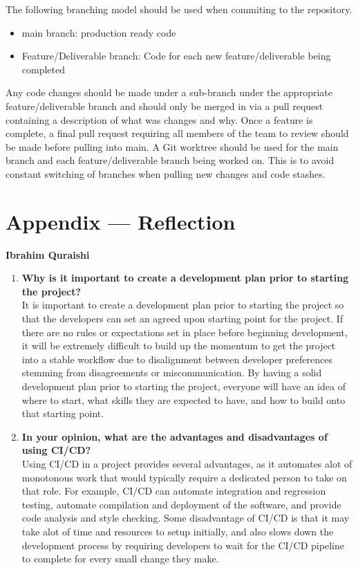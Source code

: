 \documentclass{article}
\begin{document}
The following branching model should be used when commiting to the repository.
\begin{itemize}
  \item main branch: production ready code
  \item Feature/Deliverable branch: Code for each new feature/deliverable being completed
\end{itemize}

Any code changes should be made under a sub-branch under the appropriate feature/deliverable branch and should only be merged in via a pull request containing a description of what was changes and why. Once a feature is complete, a final pull request requiring all members of the team to review should be made before pulling into main.
\newline\newline
A Git worktree should be used for the main branch and each feature/deliverable branch being worked on. This is to avoid constant switching of branches when pulling new changes and code stashes.

\newpage{}

\section*{Appendix --- Reflection}

\textbf{Ibrahim Quraishi}
\begin{enumerate}
    \item \textbf{Why is it important to create a development plan prior to starting the
    project?}\\

    It is important to create a development plan prior to starting the project so that the developers can set an agreed upon starting point for the project. If there are no rules or expectations set in place before beginning development, it will be extremely difficult to build up the momentum to get the project into a stable workflow due to disalignment between developer preferences stemming from disagreements or miscommunication. By having a solid development plan prior to starting the project, everyone will have an idea of where to start, what skills they are expected to have, and how to build onto that starting point.

    \item \textbf{In your opinion, what are the advantages and disadvantages of using
    CI/CD?}\\

    Using CI/CD in a project provides several advantages, as it automates alot of monotonous work that would typically require a dedicated person to take on that role. For example, CI/CD can automate integration and regression testing, automate compilation and deployment of the software, and provide code analysis and style checking. Some disadvantage of CI/CD is that it may take alot of time and resources to setup initially, and also slows down the development process by requiring developers to wait for the CI/CD pipeline to complete for every small change they make.
\end{enumerate}
\end{document}

